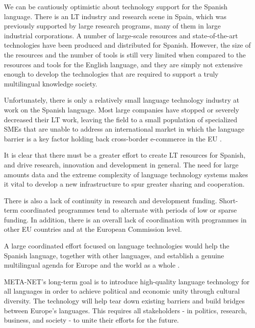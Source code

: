 \begin{multicols}{2}
We can be cautiously optimistic about technology support for the Spanish language. There is an LT industry and research scene in Spain, which was previously supported by large research programs, many of them in large industrial corporations. A number of large-scale resources and state-of-the-art technologies have been produced and distributed for Spanish. However, the size of the resources and the number of tools is still very limited when compared to the resources and tools for the English language, and they are simply not extensive enough to develop the technologies that are required to support a truly multilingual knowledge society.

Unfortunately, there is only a relatively small language technology industry at work on the Spanish language. Most large companies have stopped or severely decreased their LT work, leaving the field to a small population of specialized SMEs that are unable to address an international market in which the language barrier is a key factor holding back cross-border e-commerce in the EU \cite{EUecommerce}.

It is clear that there must be a greater effort to create LT resources for Spanish, and drive research, innovation and development in general. The need for large amounts data and the extreme complexity of language technology systems makes it vital to develop a new infrastructure to spur greater sharing and cooperation.

There is also a lack of continuity in research and development funding. Short-term coordinated programmes tend to alternate with periods of low or sparse funding. In addition, there is an overall lack of coordination with programmes in other EU countries and at the European Commission level.

A large coordinated effort focused on language technologies would help the Spanish language, together with other languages, and establish a genuine multilingual agenda for Europe and the world as a whole \cite{HuLaTec}. 

META-NET’s long-term goal is to introduce high-quality language technology for all languages in order to achieve political and economic unity through cultural diversity. The technology will help tear down existing barriers and build bridges between Europe’s languages. This requires all stakeholders - in politics, research, business, and society - to unite their efforts for the future.

\end{multicols}

